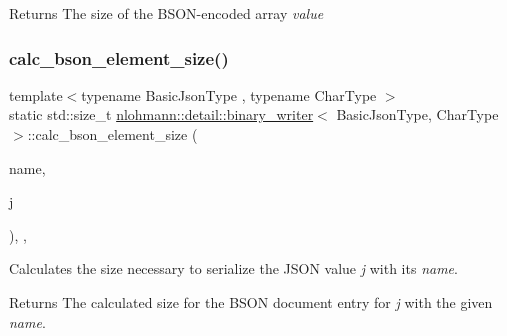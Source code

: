 \begin{DoxyReturn}{Returns}
The size of the B\+S\+O\+N-\/encoded array {\itshape value} 
\end{DoxyReturn}
\mbox{\label{classnlohmann_1_1detail_1_1binary__writer_a1e4372c5984184eb5bcc09af1fcc2ee0}} 
\subsubsection{\texorpdfstring{calc\+\_\+bson\+\_\+element\+\_\+size()}{calc\_bson\_element\_size()}}
{\footnotesize\ttfamily template$<$typename Basic\+Json\+Type , typename Char\+Type $>$ \\
static std\+::size\+\_\+t \mbox{\hyperlink{classnlohmann_1_1detail_1_1binary__writer}{nlohmann\+::detail\+::binary\+\_\+writer}}$<$ Basic\+Json\+Type, Char\+Type $>$\+::calc\+\_\+bson\+\_\+element\+\_\+size (\begin{DoxyParamCaption}\item[{const string\+\_\+t \&}]{name,  }\item[{const Basic\+Json\+Type \&}]{j }\end{DoxyParamCaption})\hspace{0.3cm}{\ttfamily [inline]}, {\ttfamily [static]}, {\ttfamily [private]}}



Calculates the size necessary to serialize the J\+S\+ON value {\itshape j} with its {\itshape name}. 

\begin{DoxyReturn}{Returns}
The calculated size for the B\+S\+ON document entry for {\itshape j} with the given {\itshape name}. 
\end{DoxyReturn}
\mbox{\label{classnlohmann_1_1detail_1_1binary__writer_a5bae2f1db2c511b869dffaddf15a1653}} 

